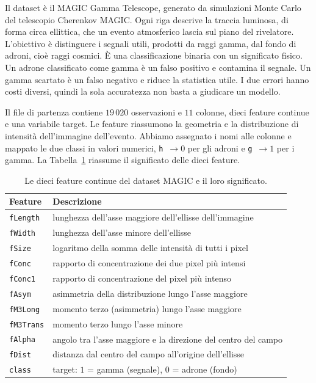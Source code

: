 \documentclass[12pt,a4paper]{article}
\begin{document}
Il dataset è il MAGIC Gamma Telescope, generato da simulazioni Monte Carlo del telescopio Cherenkov
MAGIC. Ogni riga descrive la traccia luminosa, di forma circa ellittica, che un evento atmosferico
lascia sul piano del rivelatore. L'obiettivo è distinguere i segnali utili, prodotti da raggi gamma,
dal fondo di adroni, cioè raggi cosmici. È una classificazione binaria con un significato fisico. Un
adrone classificato come gamma è un falso positivo e contamina il segnale. Un gamma scartato è un
falso negativo e riduce la statistica utile. I due errori hanno costi diversi, quindi la sola
accuratezza non basta a giudicare un modello.

Il file di partenza contiene $19\,020$ osservazioni e $11$ colonne, dieci feature continue e una
variabile target. Le feature riassumono la geometria e la distribuzione di intensità dell'immagine
dell'evento. Abbiamo assegnato i nomi alle colonne e mappato le due classi in valori numerici,
\texttt{h}~$\rightarrow 0$ per gli adroni e \texttt{g}~$\rightarrow 1$ per i gamma. La
Tabella~\ref{tab:feature} riassume il significato delle dieci feature.

\begin{table}[H]\centering\small
\caption{Le dieci feature continue del dataset MAGIC e il loro significato.}\label{tab:feature}
\begin{tabular}{ll}
\toprule
\textbf{Feature} & \textbf{Descrizione} \\
\midrule
\texttt{fLength}   & lunghezza dell'asse maggiore dell'ellisse dell'immagine \\
\texttt{fWidth}    & lunghezza dell'asse minore dell'ellisse \\
\texttt{fSize}     & logaritmo della somma delle intensità di tutti i pixel \\
\texttt{fConc}     & rapporto di concentrazione dei due pixel più intensi \\
\texttt{fConc1}    & rapporto di concentrazione del pixel più intenso \\
\texttt{fAsym}     & asimmetria della distribuzione lungo l'asse maggiore \\
\texttt{fM3Long}   & momento terzo (asimmetria) lungo l'asse maggiore \\
\texttt{fM3Trans}  & momento terzo lungo l'asse minore \\
\texttt{fAlpha}    & angolo tra l'asse maggiore e la direzione del centro del campo \\
\texttt{fDist}     & distanza dal centro del campo all'origine dell'ellisse \\
\midrule
\texttt{class}     & target: $1$ = gamma (segnale), $0$ = adrone (fondo) \\
\bottomrule
\end{tabular}
\end{table}
\end{document}
